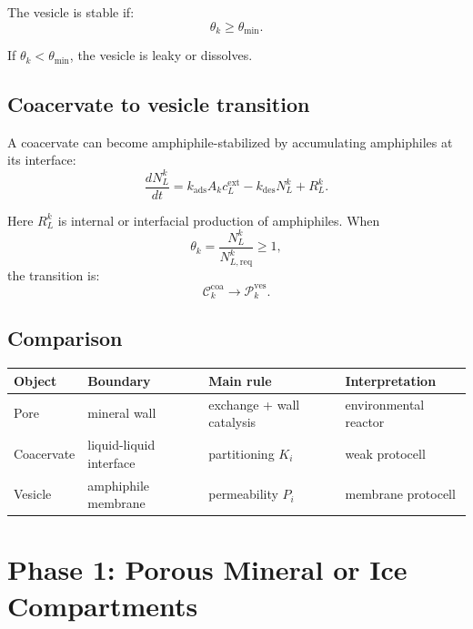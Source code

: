 \documentclass[11pt]{article}
\begin{document}
The vesicle is stable if:
\begin{equation}
    \theta_k \geq \theta_{\min}.
\end{equation}

If $\theta_k<\theta_{\min}$, the vesicle is leaky or dissolves.

\subsection{Coacervate to vesicle transition}

A coacervate can become amphiphile-stabilized by accumulating amphiphiles at
its interface:
\begin{equation}
    \frac{dN_L^k}{dt}
    =
    k_{\mathrm{ads}}A_kc_L^{\mathrm{ext}}
    -
    k_{\mathrm{des}}N_L^k
    +
    R_L^k.
\end{equation}

Here $R_L^k$ is internal or interfacial production of amphiphiles. When
\begin{equation}
    \theta_k =
    \frac{N_L^k}{N_{L,\mathrm{req}}^k}
    \geq 1,
\end{equation}
the transition is:
\begin{equation}
    \mathcal{C}_k^{\mathrm{coa}}
    \rightarrow
    \mathcal{P}_k^{\mathrm{ves}}.
\end{equation}

\subsection{Comparison}

\begin{center}
\begin{tabular}{llll}
\toprule
Object & Boundary & Main rule & Interpretation \\
\midrule
Pore & mineral wall & exchange + wall catalysis & environmental reactor \\
Coacervate & liquid-liquid interface & partitioning $K_i$ & weak protocell \\
Vesicle & amphiphile membrane & permeability $P_i$ & membrane protocell \\
\bottomrule
\end{tabular}
\end{center}

\section{Phase 1: Porous Mineral or Ice Compartments}
\end{document}
